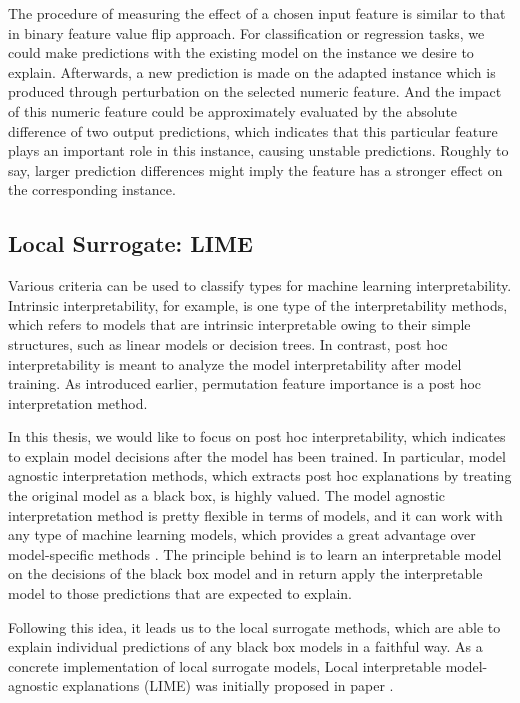 The procedure of measuring the effect of a chosen input feature is similar to that in binary feature value flip approach. For classification or regression tasks, we could make predictions with the existing model on the instance we desire to explain. Afterwards, a new prediction is made on the adapted instance which is produced through perturbation on the selected numeric feature. And the impact of this numeric feature could be approximately evaluated by the absolute difference of two output predictions, which indicates that this particular feature plays an important role in this instance, causing unstable predictions. Roughly to say, larger prediction differences might imply the feature has a stronger effect on the corresponding instance. 


\subsection{Local Surrogate: LIME}

Various criteria can be used to classify types for machine learning interpretability. Intrinsic interpretability, for example, is one type of the interpretability methods, which refers to models that are intrinsic interpretable owing to their simple structures, such as linear models or decision trees. In contrast, post hoc interpretability is meant to analyze the model interpretability after model training. As introduced earlier, permutation feature importance is a post hoc interpretation method. 

In this thesis, we would like to focus on post hoc interpretability, which indicates to explain model decisions after the model has been trained. In particular, model agnostic interpretation methods, which extracts post hoc explanations by treating the original model as a black box, is highly valued. The model agnostic interpretation method is pretty flexible in terms of models, and it can work with any type of machine learning models, which provides a great advantage over model-specific methods \cite{ribeiro2016model}. The principle behind is to learn an interpretable model on the decisions of the black box model and in return apply the interpretable model to those predictions that are expected to explain.  

Following this idea, it leads us to the local surrogate methods, which are able to explain individual predictions of any black box models in a faithful way. As a concrete implementation of local surrogate models, Local interpretable model-agnostic explanations (LIME) was initially proposed in paper \cite{ribeiro2016should}. 

